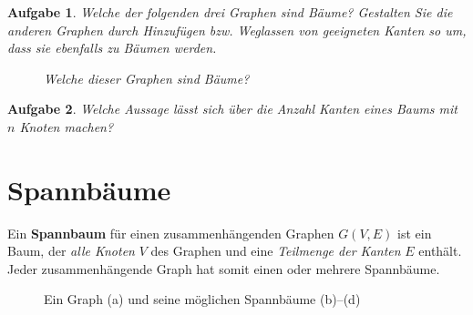 \documentclass[12pt,a4paper]{report}
\theoremstyle{break}
\newtheorem{exercise}{Aufgabe}[chapter]
\theoremstyle{plain}
\begin{document}
\begin{exercise}\label{exbaum}
Welche der folgenden drei Graphen sind B\"{a}ume? Gestalten Sie die
anderen Graphen durch Hinzuf\"{u}gen bzw. Weglassen von geeigneten
Kanten so um, dass sie ebenfalls zu B\"{a}umen werden.

\begin{figure}[h!]
\begin{subfigure}[b]{0.3\textwidth}
\caption{}
\end{subfigure}
\begin{subfigure}[b]{0.3\textwidth}
\caption{}
\end{subfigure}
\begin{subfigure}[b]{0.3\textwidth}
\caption{}
\end{subfigure}
\caption{Welche dieser Graphen sind B\"{a}ume?}
\end{figure}

\end{exercise}

\newpage
\begin{exercise}\label{exvertnode}
Welche Aussage l\"{a}sst sich \"{u}ber die Anzahl Kanten eines Baums
mit $n$ Knoten machen?
\end{exercise}

\section{Spannb\"{a}ume}

Ein \textbf{Spannbaum} f\"{u}r einen zusammenh\"{a}ngenden Graphen
$G(V,E)$ ist ein Baum, der \emph{alle Knoten} $V$ des
Graphen und eine \emph{Teilmenge der Kanten} $E$ enth\"{a}lt. Jeder
zusammenh\"{a}ngende Graph hat somit einen oder mehrere Spannb\"{a}ume.

\begin{figure}[h!]
\begin{subfigure}[b]{0.24\textwidth}
\caption{}
\end{subfigure}
\begin{subfigure}[b]{0.24\textwidth}
\caption{}
\end{subfigure}
\begin{subfigure}[b]{0.24\textwidth}
\caption{}
\end{subfigure}
\begin{subfigure}[b]{0.24\textwidth}
\caption{}
\end{subfigure}
\caption{Ein Graph (a) und seine m\"{o}glichen Spannb\"{a}ume (b)--(d)}
\end{figure}
\end{document}
